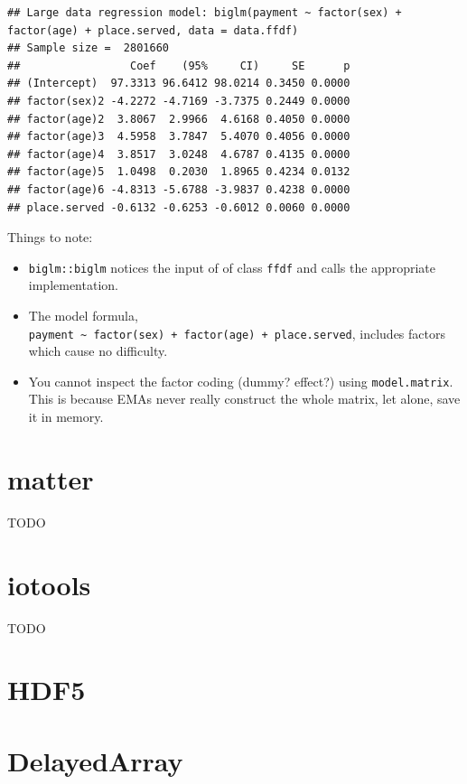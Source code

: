 \documentclass[]{book}
\providecommand{\tightlist}{%
  \setlength{\itemsep}{0pt}\setlength{\parskip}{0pt}}
\theoremstyle{definition}
\theoremstyle{definition}
\theoremstyle{definition}
\theoremstyle{remark}
\begin{document}
\begin{verbatim}
## Large data regression model: biglm(payment ~ factor(sex) + factor(age) + place.served, data = data.ffdf)
## Sample size =  2801660 
##                 Coef    (95%     CI)     SE      p
## (Intercept)  97.3313 96.6412 98.0214 0.3450 0.0000
## factor(sex)2 -4.2272 -4.7169 -3.7375 0.2449 0.0000
## factor(age)2  3.8067  2.9966  4.6168 0.4050 0.0000
## factor(age)3  4.5958  3.7847  5.4070 0.4056 0.0000
## factor(age)4  3.8517  3.0248  4.6787 0.4135 0.0000
## factor(age)5  1.0498  0.2030  1.8965 0.4234 0.0132
## factor(age)6 -4.8313 -5.6788 -3.9837 0.4238 0.0000
## place.served -0.6132 -0.6253 -0.6012 0.0060 0.0000
\end{verbatim}

Things to note:

\begin{itemize}
\tightlist
\item
  \texttt{biglm::biglm} notices the input of of class \texttt{ffdf} and
  calls the appropriate implementation.
\item
  The model formula,
  \texttt{payment\ \textasciitilde{}\ factor(sex)\ +\ factor(age)\ +\ place.served},
  includes factors which cause no difficulty.
\item
  You cannot inspect the factor coding (dummy? effect?) using
  \texttt{model.matrix}. This is because EMAs never really construct the
  whole matrix, let alone, save it in memory.
\end{itemize}

\section{matter}\label{matter}

TODO

\section{iotools}\label{iotools}

TODO

\section{HDF5}\label{hdf5}

\section{DelayedArray}\label{delayedarray}
\end{document}

